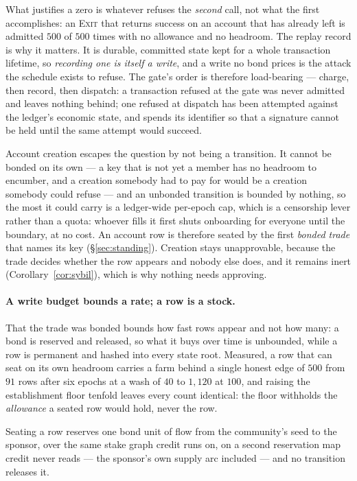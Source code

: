 What justifies a zero is whatever refuses the \emph{second} call, not what the first
accomplishes: an \textsc{Exit} that returns success on an account that has already left is
admitted $500$ of $500$ times with no allowance and no headroom. The replay record is why
it matters. It is durable, committed state kept for a whole transaction lifetime, so
\emph{recording one is itself a write}, and a write no bond prices is the attack the
schedule exists to refuse. The gate's order is therefore load-bearing --- charge, then
record, then dispatch: a transaction refused at the gate was never admitted and leaves
nothing behind; one refused at dispatch has been attempted against the ledger's economic
state, and spends its identifier so that a signature cannot be held until the same attempt
would succeed.

Account creation escapes the question by not being a transition. It cannot be bonded on
its own --- a key that is not yet a member has no headroom to encumber, and a creation
somebody had to pay for would be a creation somebody could refuse --- and an unbonded
transition is bounded by nothing, so the most it could carry is a ledger-wide per-epoch
cap, which is a censorship lever rather than a quota: whoever fills it first shuts
onboarding for everyone until the boundary, at no cost. An account row is therefore seated
by the first \emph{bonded trade} that names its key (\S\ref{sec:standing}). Creation stays
unapprovable, because the trade decides whether the row appears and nobody else does, and
it remains inert (Corollary~\ref{cor:sybil}), which is why nothing needs approving.

\paragraph{A write budget bounds a rate; a row is a stock.} That the trade was bonded
bounds how fast rows appear and not how many: a bond is reserved and released, so what it
buys over time is unbounded, while a row is permanent and hashed into every state root.
Measured, a row that can seat on its own headroom carries a farm behind a single honest
edge of $500$ from $91$ rows after six epochs at a wash of $40$ to $1{,}120$ at $100$, and
raising the establishment floor tenfold leaves every count identical: the floor withholds
the \emph{allowance} a seated row would hold, never the row.

\begin{property}
\label{prop:seat}
Seating a row reserves one bond unit of flow from the community's seed to the sponsor,
over the same stake graph credit runs on, on a second reservation map credit never reads
--- the sponsor's own supply arc included --- and no transition releases it.
\end{property}

